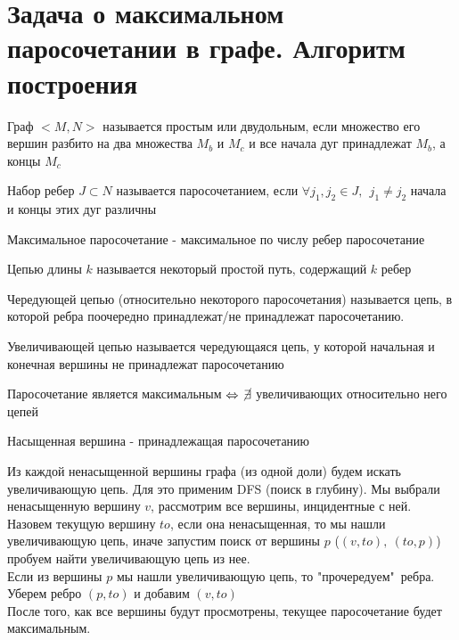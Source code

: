 \documentclass[discrete.tex]{subfiles}
\begin{document}
\section{Задача о максимальном паросочетании в графе. Алгоритм построения}

\begin{definition}
    Граф $<M, N>$ называется простым или двудольным, если множество его вершин разбито на два
    множества $M_b$ и $M_c$ и все начала дуг принадлежат $M_b$, а концы $M_c$
\end{definition}

\begin{definition}
    Набор ребер $J \subset N$ называется паросочетанием, если $\forall j_1, j_2 \in J,\ \
    j_1 \neq j_2$ начала и концы этих дуг различны
\end{definition}

\begin{definition}
    Максимальное паросочетание - максимальное по числу ребер паросочетание
\end{definition}

\begin{definition}
    Цепью длины $k$ называется некоторый простой путь, содержащий $k$ ребер
\end{definition}

\begin{definition}
    Чередующей цепью (относительно некоторого паросочетания) называется цепь,
    в которой ребра поочередно принадлежат/не принадлежат паросочетанию.
\end{definition}

\begin{definition}
    Увеличивающей цепью называется чередующаяся цепь, у которой начальная и конечная
    вершины не принадлежат паросочетанию
\end{definition}

\begin{theorem}[Бержа]
    Паросочетание является максимальным $\Leftrightarrow$ $\cancel{\exists }$ увеличивающих
    относительно него цепей
\end{theorem}

\begin{definition}
    Насыщенная вершина - принадлежащая паросочетанию
\end{definition}

\begin{definition}
    Из каждой ненасыщенной вершины графа (из одной доли) будем искать увеличивающую цепь.
    Для это применим DFS (поиск в глубину). Мы выбрали ненасыщенную вершину $v$, рассмотрим все вершины,
    инцидентные с ней. Назовем текущую вершину $to$, если она ненасыщенная, то мы
    нашли увеличивающую цепь, иначе запустим поиск от вершины $p$ ($(v, to), \ (to, p)$)
    пробуем найти увеличивающую цепь из нее.\\
    Если из вершины $p$ мы нашли увеличивающую цепь, то "прочередуем"\ ребра. Уберем
    ребро $(p, to)$ и добавим $(v, to)$\\
    После того, как все вершины будут просмотрены, текущее паросочетание будет
    максимальным.
\end{definition}
\end{document}
